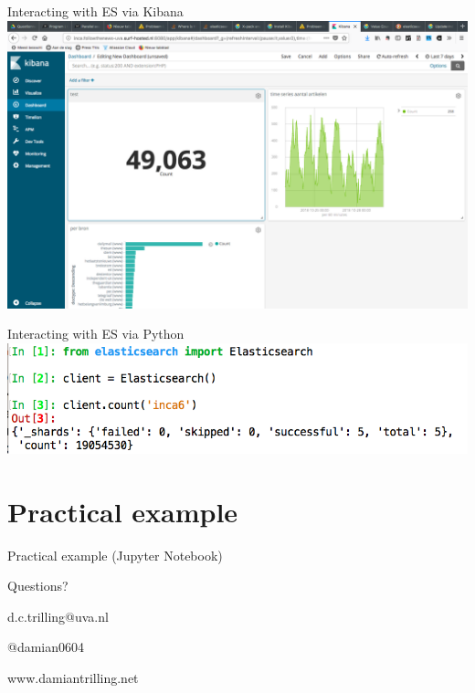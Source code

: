\documentclass{beamer}
\begin{document}
\begin{frame}{Interacting with ES via Kibana}
	\includegraphics[width=\columnwidth,height=\paperheight,keepaspectratio]{kibana}
\end{frame}


\begin{frame}{Interacting with ES via Python}
	\includegraphics[width=\columnwidth,height=\paperheight,keepaspectratio]{python}
\end{frame}




\section{Practical example}

\begin{frame}
	Practical example (Jupyter Notebook)
\end{frame}

\begin{frame}{Questions?}
\huge
\centering

d.c.trilling@uva.nl

@damian0604

www.damiantrilling.net


	
\end{frame}
\end{document}
